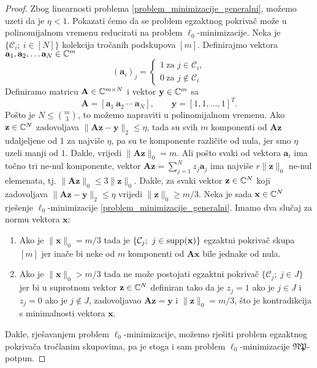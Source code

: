 \documentclass[a4paper,twoside,12pt]{memoir} %
\newcommand{\vect}[1]{\mathbf{#1}}
\renewcommand{\vec}{\vect}
\newcommand{\supp}{\text{\normalfont{supp}}}
\newcommand{\norm}[1]{\|{#1}\|}
\begin{document}
\begin{proof}
    Zbog linearnosti problema \eqref{problem_minimizacije_generalni}, mo\v{z}emo uzeti da je $\eta < 1$. Pokazati \'cemo da se problem egzaktnog pokriva\v{c} mo\v{z}e u polinomijalnom vremenu reducirati na problem $\ell_0$-minimizacije. Neka je $\{\mathcal{C}_i;\ i \in [N]\}$ kolekcija tro\v{c}anih podskupova $[m]$. Definirajmo vektora $\vec a_1, \vec a_2,\dots \vec a_N \in \C^m$
    \begin{equation*}
        (\vec a_i)_j = 
        \begin{cases*}
            1\ \text{za } j \in \mathcal{C}_i,\\
            0\ \text{za } j \not\in \mathcal{C}_i
        \end{cases*}
    \end{equation*}
    Definiramo matricu $\vec A \in \C^{m \times N}$ i vektor $\vec y \in \C^m$ sa
    \begin{equation*}
        \vec A = [\vec a_1\ \vec a_2\ \cdots \ \vec a_N], \qquad \vec y = [1,1, \dots, 1]^T.
    \end{equation*}
    Po\v{s}to je $N \leq {m \choose 3}$, to mo\v{z}emo napraviti u polinomijalnom vremenu. Ako $\vec z \in \C^N$ zadovoljava $\norm{\vec{Az}-\vec y}_2 \leq \eta$, tada su svih $m$ komponenti od $\vec{Az}$ udaljeljene od $1$ za najvi\v{s}e $\eta$, pa su te komponente razli\v{c}ite od nula, jer smo $\eta$ uzeli manji od $1$. Dakle, vrijedi $\norm{\vec{Az}}_0 = m$. Ali po\v{s}to svaki od vektora $\vec a_i$ ima to\v{c}no tri ne-nul komponente, vektor $\vec{Az}=\sum_{j=1}^N z_j \vec a_j$ ima najvi\v{s}e $r \norm{\vec z}_0$ ne-nul elemenata, tj. $\norm{\vec{Az}}_0 \leq 3 \norm{\vec{z}}_0$. Dakle, za svaki vektor $\vec z \in \C^N$ koji zadovoljava $\norm{\vec{Az}-\vec y}_2 \leq \eta$ vrijedi $\norm{\vec z}_0 \geq m/3$. Neka je sada $\vec x \in \C^N$ rje\v{s}enje $\ell_0$-minimizacije \eqref{problem_minimizacije_generalni}. Imamo dva slu\v{c}aj za normu vektora $\vec x$:
    \begin{enumerate}
        \item Ako je $\norm{\vec{x}}_0 = m/3$ tada je $\{\mathcal{C}_j;\ j \in \supp(\vec x)\}$ egzaktni pokriva\v{c} skupa $[m]$ jer ina\v{c}e bi neke od $m$ komponenti od $\vec{Ax}$ bile jednake od nula.
        \item Ako je $\norm{\vec{x}}_0 > m/3$ tada ne mo\v{z}e postojati egzaktni pokriva\v{c} $\{\mathcal{C}_j;\ j \in J\}$ jer bi u suprotnom vektor $\vec z \in \C^N$ definiran tako da je $z_j = 1$ ako je $j \in J$ i $z_j = 0$ ako je $j \not \in J$, zadovoljavao $\vec{Az}=\vec y$ i $\norm{\vec z}_0=m/3$, \v{s}to je kontradikcija s minimalnosti vektora $\vec x$.
    \end{enumerate}
    Dakle, rje\v{s}avanjem problem $\ell_0$-minimizacije, mo\v{z}emo rje\v{s}iti problem egzaktnog pokriva\v{c}a tro\v{c}lanim skupovima, pa je stoga i sam problem $\ell_0$-minimizacije $\mathfrak{NP}$-potpun.
\end{proof}
\end{document}
